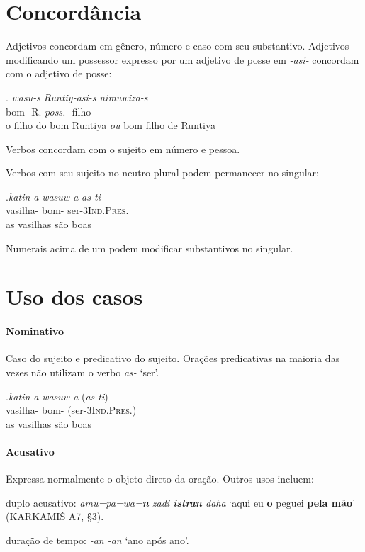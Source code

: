 
\section{Concordância}

Adjetivos concordam em gênero, número e caso com seu
substantivo.
Adjetivos modificando um possessor expresso por um adjetivo de posse em
\emph{-asi-} concordam com o adjetivo de posse:

\exg. \emph{wasu-s} \emph{Runtiy-asi-s} \emph{nimuwiza-s}\\
bom-\Nom\Sg\Com{} R.-\emph{poss.}-\Nom\Sg\Com{} filho-\Nom{}\Sg\Com{}\\
o filho do bom Runtiya \emph{ou} bom filho de Runtiya


\noindent Verbos concordam com o sujeito em número e pessoa.

Verbos com seu sujeito no neutro plural podem permanecer no singular:

\exg.\emph{katin-a} \emph{wasuw-a} \emph{as-ti}\\
vasilha-\Nom\Pl\Neut{} bom-\Nom\Pl\Neut{} ser-3\Sg\textsc{Ind.Pres.}\\
as vasilhas são boas


\noindent Numerais acima de um podem modificar substantivos no singular.


\section{Uso dos casos}

\paragraph{Nominativo}
Caso do sujeito e predicativo do sujeito.
Orações predicativas na maioria das vezes não utilizam o verbo \emph{as-} `ser'.

\exg.\emph{katin-a} \emph{wasuw-a} (\emph{as-ti})\\
vasilha-\Nom\Pl\Neut{} bom-\Nom\Pl\Neut{} (ser-3\Sg\textsc{Ind.Pres.})\\
as vasilhas são boas


\paragraph{Acusativo}
Expressa normalmente o objeto direto da oração.
Outros usos incluem:
\begin{inparaenum}[(a)]
	\item duplo acusativo: \emph{amu=pa=wa=\textbf{n} zadi \textbf{istran} daha}
		`aqui eu \textbf{o} peguei \textbf{pela mão}' (KARKAMIŠ A7, §3).
	\item duração de tempo: \emph{-an -an} `ano após
		ano'.
\end{inparaenum}


